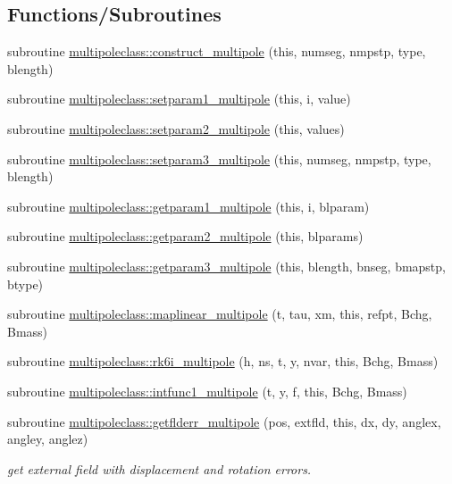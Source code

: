 \subsection*{Functions/\+Subroutines}
\begin{DoxyCompactItemize}
\item 
subroutine \mbox{\hyperlink{namespacemultipoleclass_acce84c33b6ef25e4e2ee0572faa92b60}{multipoleclass\+::construct\+\_\+multipole}} (this, numseg, nmpstp, type, blength)
\item 
subroutine \mbox{\hyperlink{namespacemultipoleclass_a85869614f5049e8bb17c4f195011fca5}{multipoleclass\+::setparam1\+\_\+multipole}} (this, i, value)
\item 
subroutine \mbox{\hyperlink{namespacemultipoleclass_ac9e1b3b044ae69816a92317bcfd1bc05}{multipoleclass\+::setparam2\+\_\+multipole}} (this, values)
\item 
subroutine \mbox{\hyperlink{namespacemultipoleclass_ad752ec84fa7145abc1b9130eb8654867}{multipoleclass\+::setparam3\+\_\+multipole}} (this, numseg, nmpstp, type, blength)
\item 
subroutine \mbox{\hyperlink{namespacemultipoleclass_afc5919c9854c17e95241242284635eaf}{multipoleclass\+::getparam1\+\_\+multipole}} (this, i, blparam)
\item 
subroutine \mbox{\hyperlink{namespacemultipoleclass_a4ee9aad22a430e9de1e1abb8ea21b058}{multipoleclass\+::getparam2\+\_\+multipole}} (this, blparams)
\item 
subroutine \mbox{\hyperlink{namespacemultipoleclass_a75142a086a96c998e2ce878857d50179}{multipoleclass\+::getparam3\+\_\+multipole}} (this, blength, bnseg, bmapstp, btype)
\item 
subroutine \mbox{\hyperlink{namespacemultipoleclass_ab9ed6db5fa3b4ea0f6e1a07cd6d57431}{multipoleclass\+::maplinear\+\_\+multipole}} (t, tau, xm, this, refpt, Bchg, Bmass)
\item 
subroutine \mbox{\hyperlink{namespacemultipoleclass_aebbed53759ae97dc55df35264c89274c}{multipoleclass\+::rk6i\+\_\+multipole}} (h, ns, t, y, nvar, this, Bchg, Bmass)
\item 
subroutine \mbox{\hyperlink{namespacemultipoleclass_adba27354e821268f6cb786c415a5bc91}{multipoleclass\+::intfunc1\+\_\+multipole}} (t, y, f, this, Bchg, Bmass)
\item 
subroutine \mbox{\hyperlink{namespacemultipoleclass_ade719df1a7d0e47f6495032cb64b1450}{multipoleclass\+::getflderr\+\_\+multipole}} (pos, extfld, this, dx, dy, anglex, angley, anglez)
\begin{DoxyCompactList}\small\item\em get external field with displacement and rotation errors. \end{DoxyCompactList}\item 

\end{DoxyCompactItemize}
